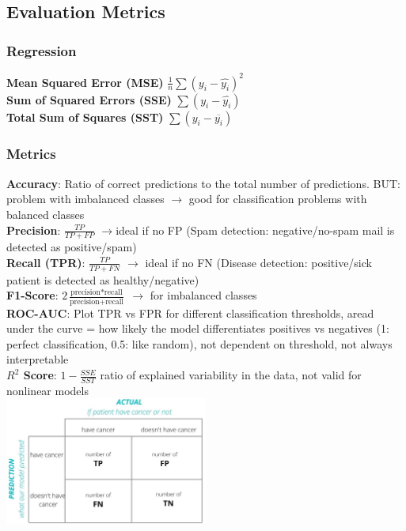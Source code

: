 \documentclass[english]{latex4ei/latex4ei_sheet}
\begin{document}
\begin{sectionbox}
\subsection{Evaluation Metrics}
\subsubsection{Regression}
\textbf{Mean Squared Error (MSE)} $\frac{1}{n}\sum (y_i - \hat{y_i})^2$\\
\textbf{Sum of Squared Errors (SSE)} $\sum (y_i - \hat{y_i})$\\
\textbf{Total Sum of Squares (SST)} $\sum (y_i - \overline{y_i})$\\

\subsubsection{Metrics}
\textbf{Accuracy}: Ratio of correct predictions to the total number of predictions. BUT: problem with imbalanced classes $\rightarrow$ good for classification problems with balanced classes\\
\textbf{Precision}: $\frac{TP}{TP+FP}$ $\rightarrow$ideal if no FP (Spam detection: negative/no-spam mail is detected as positive/spam)\\
\textbf{Recall (TPR)}: $\frac{TP}{TP+FN}$ $\rightarrow$ ideal if no FN (Disease detection: positive/sick patient is detected as healthy/negative)\\
\textbf{F1-Score}: $2\frac{\text{precision} * \text{recall}}{\text{precision} + \text{recall}}$ $\rightarrow$ for imbalanced classes\\
\textbf{ROC-AUC}: Plot TPR vs FPR for different classification thresholds, aread under the curve = how likely the model differentiates positives vs negatives (1: perfect classification, 0.5: like random), not dependent on threshold, not always interpretable\\
\textbf{$R^2$ Score}: $1-\frac{SSE}{SST}$ ratio of explained variability in the data, not valid for nonlinear models \\


\includegraphics[width=0.5\textwidth]{cheat_sheets/img/confusion.jpeg}

\end{sectionbox}
\end{document}
